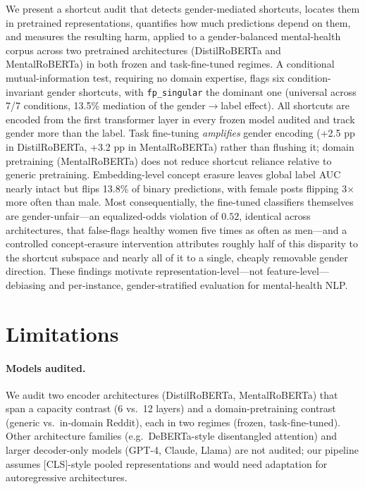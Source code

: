 \documentclass[11pt]{article}
\begin{document}
We present a shortcut audit that detects gender-mediated shortcuts, locates them in pretrained representations, quantifies how much predictions depend on them, and measures the resulting harm, applied to a gender-balanced mental-health corpus across two pretrained architectures (DistilRoBERTa and MentalRoBERTa) in both frozen and task-fine-tuned regimes. A conditional mutual-information test, requiring no domain expertise, flags six condition-invariant gender shortcuts, with \texttt{fp\_singular} the dominant one (universal across 7/7 conditions, 13.5\% mediation of the gender$\to$label effect). All shortcuts are encoded from the first transformer layer in every frozen model audited and track gender more than the label. Task fine-tuning \emph{amplifies} gender encoding (+2.5 pp in DistilRoBERTa, +3.2 pp in MentalRoBERTa) rather than flushing it; domain pretraining (MentalRoBERTa) does not reduce shortcut reliance relative to generic pretraining. Embedding-level concept erasure leaves global label AUC nearly intact but flips 13.8\% of binary predictions, with female posts flipping 3$\times$ more often than male. Most consequentially, the fine-tuned classifiers themselves are gender-unfair---an equalized-odds violation of $0.52$, identical across architectures, that false-flags healthy women five times as often as men---and a controlled concept-erasure intervention attributes roughly half of this disparity to the shortcut subspace and nearly all of it to a single, cheaply removable gender direction. These findings motivate representation-level---not feature-level---debiasing and per-instance, gender-stratified evaluation for mental-health NLP.

\section*{Limitations}

\paragraph{Models audited.} We audit two encoder architectures (DistilRoBERTa, MentalRoBERTa) that span a capacity contrast (6 vs.\ 12 layers) and a domain-pretraining contrast (generic vs.\ in-domain Reddit), each in two regimes (frozen, task-fine-tuned). Other architecture families (e.g.\ DeBERTa-style disentangled attention) and larger decoder-only models (GPT-4, Claude, Llama) are not audited; our pipeline assumes [CLS]-style pooled representations and would need adaptation for autoregressive architectures.
\end{document}
